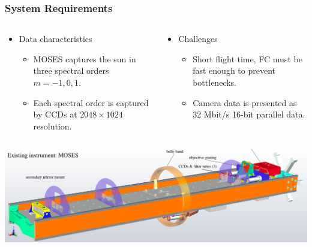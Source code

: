 \documentclass[landscape,xcolor={table}]{beamer}
\begin{document}
	\begin{frame}
	
		\frametitle{System Requirements}
		
				\begin{columns}[T] %
				\begin{column}{.49\textwidth}
					\begin{itemize}
						\item Data characteristics
						\begin{itemize}
							\item MOSES captures the sun in three spectral orders $m=-1,0,1$.
							\item Each spectral order is captured by CCDs at $2048 \times 1024$ resolution.
								
						\end{itemize}
					\end{itemize}
					
				\end{column}%
				\hfill%
				\begin{column}{.49\textwidth}
				
					\begin{itemize}
						\item Challenges
						\begin{itemize}
							\item Short flight time, FC must be fast enough to prevent bottlenecks.
							\item Camera data is presented as 32 Mbit/s 16-bit parallel data.
						\end{itemize}
					\end{itemize}
				
				\end{column}%
				\end{columns}
		
		\includegraphics[width=\textwidth]{images/moses}

	\end{frame}
	
\end{document}
